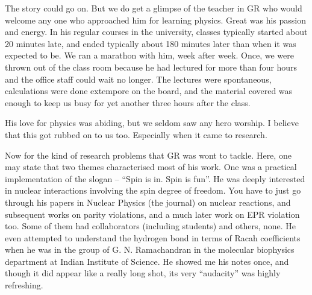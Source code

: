 The story could go on. But we do get a glimpse of the teacher in GR who would welcome any one who approached him for learning physics. Great was his passion and energy. In his regular courses in the university, classes typically started about 20 minutes late, and ended typically about 180 minutes later than when it was expected to be. We ran a marathon with him, week after week. Once, we were thrown out of the class room because he had lectured for more than four hours and the office staff could wait no longer. The lectures were spontaneous, calculations were done extempore on the board, and the material covered was enough to keep us busy for yet another three hours after the class.

His love for physics was abiding, but we seldom saw any hero worship.  I believe that this got rubbed on to us too. Especially when it came to research.

Now for the kind of research problems that GR was wont to tackle. Here, one may state that two themes characterised most of his work. One was a practical implementation of the slogan -- “Spin is in. Spin is fun”. He was deeply interested in nuclear interactions involving the spin degree of freedom. You have to just go through his papers in Nuclear Physics (the journal) on nuclear reactions, and subsequent works on parity violations, and a much later work on EPR violation too. Some of them had collaborators (including students) and others, none. He even attempted to understand the hydrogen bond in terms of Racah coefficients when he was in the group of G. N. Ramachandran in the molecular biophysics department at Indian Institute of Science. He showed me his notes once, and though it did appear like a really long shot, its very “audacity” was highly refreshing.

